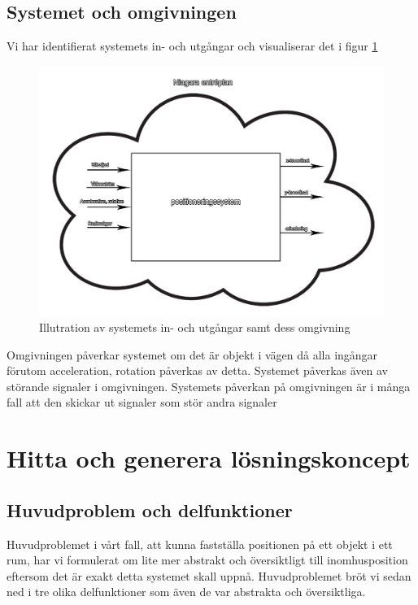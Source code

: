 \documentclass[11pt, a4paper]{report}
\begin{document}
\subsection{Systemet och omgivningen}
Vi har identifierat systemets in- och utgångar och visualiserar det i figur \ref{fig:system-omgivning}
\begin{figure}[H]
	\begin{center}
		\includegraphics [width=12cm,angle=0]{System-omgivning.PNG}
		\caption{Illutration av systemets in- och utgångar samt dess omgivning}
		\label{fig:system-omgivning}
	\end{center}
\end{figure}

Omgivningen påverkar systemet om det är objekt i vägen då alla ingångar förutom acceleration, rotation påverkas av detta. Systemet påverkas även av störande signaler i omgivningen. Systemets påverkan på omgivningen är i många fall att den skickar ut signaler som stör andra signaler

\clearpage


\section{Hitta och generera lösningskoncept}

\subsection{Huvudproblem och delfunktioner}

Huvudproblemet i vårt fall, att kunna fastställa positionen på ett objekt i ett rum, har vi formulerat om lite mer abstrakt och översiktligt till inomhusposition eftersom det är exakt detta systemet skall uppnå. Huvudproblemet bröt vi sedan ned i tre olika delfunktioner som även de var abstrakta och översiktliga.
\end{document}

